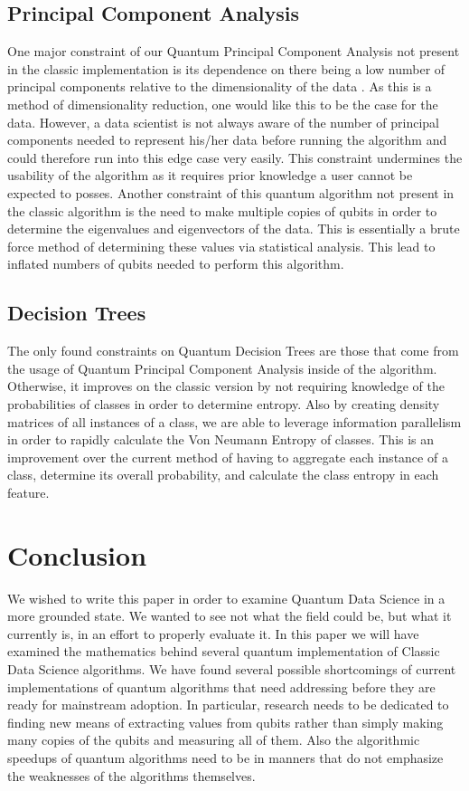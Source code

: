 \documentclass[conference]{IEEEtran}
\begin{document}
\subsection{Principal Component Analysis}
One major constraint of our Quantum Principal Component Analysis not present in the classic implementation is its dependence on there being a low number of principal components relative to the dimensionality of the data \cite{b6}. As this is a method of dimensionality reduction, one would like this to be the case for the data. However, a data scientist is not always aware of the number of principal components needed to represent his/her data before running the algorithm and could therefore run into this edge case very easily. This constraint undermines the usability of the algorithm as it requires prior knowledge a user cannot be expected to posses. \newline
\indent Another constraint of this quantum algorithm not present in the classic algorithm is the need to make multiple copies of qubits in order to determine the eigenvalues and eigenvectors of the data. This is essentially a brute force method of determining these values via statistical analysis. This lead to inflated numbers of qubits needed to perform this algorithm.  
\subsection{Decision Trees}
The only found constraints on Quantum Decision Trees are those that come from the usage of Quantum Principal Component Analysis inside of the algorithm. Otherwise, it improves on the classic version by not requiring knowledge of the probabilities of classes in order to determine entropy. Also by creating density matrices of all instances of a class, we are able to leverage information parallelism in order to rapidly calculate the Von Neumann Entropy of classes. This is an improvement over the current method of having to aggregate each instance of a class, determine its overall probability, and calculate the class entropy in each feature. 

\section{Conclusion}
We wished to write this paper in order to examine Quantum Data Science in a more grounded state. We wanted to see not what the field could be, but what it currently is, in an effort to properly evaluate it. In this paper we will have examined the mathematics behind several quantum implementation of Classic Data Science algorithms. We have found several possible shortcomings of current implementations of quantum algorithms that need addressing before they are ready for mainstream adoption. In particular, research needs to be dedicated to finding new means of extracting values from qubits rather than simply making many copies of the qubits and measuring all of them. Also the algorithmic speedups of quantum algorithms need to be in manners that do not emphasize the weaknesses of the algorithms themselves.   
\end{document}
